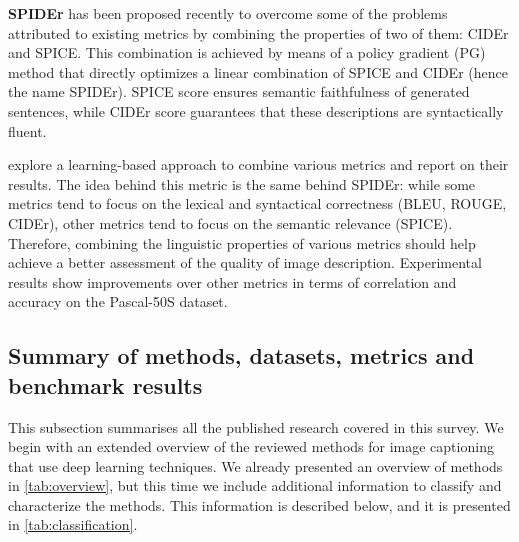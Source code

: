 \textbf{SPIDEr} \cite{Liu2017_PG} has been proposed recently to overcome some of the problems attributed to existing metrics by combining the properties of two of them: CIDEr and SPICE. This combination is achieved by means of a policy gradient (PG) method that directly optimizes a linear combination of SPICE and CIDEr (hence the name SPIDEr). SPICE score ensures semantic faithfulness of generated sentences, while CIDEr score guarantees that these descriptions are syntactically fluent.

\citep{Sharif2018} explore a learning-based approach to combine various metrics and report on their results. The idea behind this metric is the same behind SPIDEr: while some metrics tend to focus on the lexical and syntactical correctness (BLEU, ROUGE, CIDEr), other metrics tend to focus on the semantic relevance (SPICE). Therefore, combining the linguistic properties of various metrics should help achieve a better assessment of the quality of image description. Experimental results show improvements over other metrics in terms of correlation and accuracy on the Pascal-50S dataset.

\subsection{Summary of methods, datasets, metrics and benchmark results}\label{sec:summary_and_comparison}

This subsection summarises all the published research covered in this survey. We begin with an extended overview of the reviewed methods for image captioning that use deep learning techniques. We already presented an overview of methods in \cref{tab:overview}, but this time we include additional information to classify and characterize the methods. This information is described below, and it is presented in \cref{tab:classification}.

